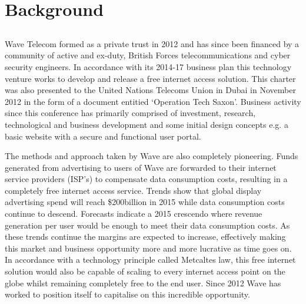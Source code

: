 \documentclass[letterpaper,10pt,openany,oneside,english]{sphinxmanual}
\begin{document}
\section{Background}
\label{\detokenize{overview:background}}

\subsection{}
\label{\detokenize{overview:wave-telecom}}
Wave Telecom formed as a private trust in 2012 and has since been financed by a community of active and ex-duty, British Forces telecommunications and cyber security engineers. In accordance with its 2014-17 business plan this technology venture works to develop and release a free internet access solution. This charter was also presented to the United Nations Telecoms Union in Dubai in November 2012 in the form of a document entitied ‘Operation Tech Saxon’. Business activity since this conference has primarily comprised of investment, research, technological and business development and some initial design concepts e.g. a basic website with a secure and functional user portal.

The methods and approach taken by Wave are also completely pioneering. Funds generated from advertising to users of Wave are forwarded to their internet service providers (ISP’s) to compensate data consumption costs, resulting in a completely free internet access service. Trends show that global display advertising spend will reach \$200billion in 2015 while data consumption costs continue to descend. Forecasts indicate a 2015 crescendo where revenue generation per user would be enough to meet their data consumption costs. As these trends continue the margins are expected to increase, effectively making this market and business opportunity more and more lucrative as time goes on. In accordance with a technology principle called Metcaltes law, this free internet solution would also be capable of scaling to every internet access point on the globe whilst remaining completely free to the end user. Since 2012 Wave has worked to position itself to capitalise on this incredible opportunity.
\end{document}

